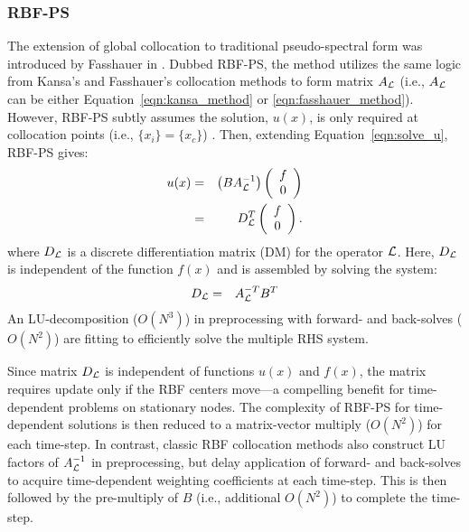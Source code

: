 \documentclass[11pt]{report}
\begin{document}
{%
\subsubsection{RBF-PS}

The extension of global collocation to traditional pseudo-spectral form was introduced by Fasshauer in \cite{Fasshauer2006}. Dubbed RBF-PS, the method utilizes the same logic from Kansa's and Fasshauer's collocation methods to form matrix $A_{\mathcal{L}}$ (i.e., $A_{\mathcal{L}}$ can be either Equation~\ref{eqn:kansa_method} or \ref{eqn:fasshauer_method}). However, RBF-PS subtly assumes the solution, $u(x)$, is only required at collocation points (i.e., $\{x_i\} = \{x_c\}$) \cite{Fasshauer2006, Fasshauer2007}. Then, extending Equation~\ref{eqn:solve_u}, RBF-PS gives:
\begin{eqnarray}
u(x) & = & \left( B A^{-1}_{\mathcal{L}} \right) \left( \begin{array}{cc}  f \\ 0  \end{array} \right) \nonumber \\
& = & D^T_{\mathcal{L}} \left( \begin{array}{cc}  f \\ 0  \end{array} \right) \label{eq:rbf-ps}.
\end{eqnarray}
where $D_{\mathcal{L}}$ is a discrete differentiation matrix (DM) for the operator $\mathcal{L}$.
Here, $D_{\mathcal{L}}$ is independent of the function $f(x)$ and is assembled by solving the system: 
\begin{eqnarray}
D_{\mathcal{L}} & = & A^{-T}_{\mathcal{L}} B^T
\end{eqnarray}
An LU-decomposition ($O(N^3)$) in preprocessing with forward- and back-solves ($O(N^2)$) are fitting to efficiently solve the multiple RHS system\cite{WrightFlyerYuen10,Fasshauer2007}. 

Since matrix $D_{\mathcal{L}}$ is independent of functions $u(x)$ and $f(x)$, the matrix requires update only if the RBF centers move---a compelling benefit for time-dependent problems on stationary nodes. The complexity of RBF-PS for time-dependent solutions is then reduced to a matrix-vector multiply ($O(N^2)$) for each time-step. In contrast, classic RBF collocation methods also construct LU factors of $A_{\mathcal{L}}^{-1}$ in preprocessing, but delay application of forward- and back-solves to acquire time-dependent weighting coefficients at each time-step. This is then followed by the pre-multiply of $B$ (i.e., additional $O(N^2)$) to complete the time-step.
 


}
\end{document}
